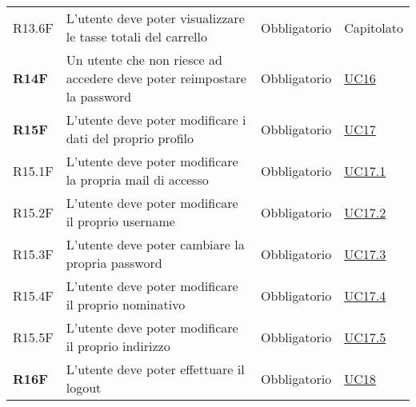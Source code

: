 \begin{center}
\begin{longtable}[!h]{p{50px} p{245px} p{75px} p{50px}}
        R13.6F                                & L'utente deve poter visualizzare le tasse totali del carrello                                                                                          & Obbligatorio             & Capitolato                                     \\
        \textbf{R14F}                         & Un utente che non riesce ad accedere deve poter reimpostare la password                                                                                & Obbligatorio             & \hyperref[sec:UC16]{UC16}                      \\
        \textbf{R15F}                         & L'utente deve poter modificare i dati del proprio profilo                                                                                              & Obbligatorio             & \hyperref[sec:UC17]{UC17}                      \\
        R15.1F                                & L'utente deve poter modificare la propria mail di accesso                                                                                              & Obbligatorio             & \hyperref[sec:UC17.1]{UC17.1}                  \\
        R15.2F                                & L'utente deve poter modificare il proprio username                                                                                                     & Obbligatorio             & \hyperref[sec:UC17.2]{UC17.2}                  \\
        R15.3F                                & L'utente deve poter cambiare la propria password                                                                                                       & Obbligatorio             & \hyperref[sec:UC17.3]{UC17.3}                  \\
        R15.4F                                & L'utente deve poter modificare il proprio nominativo                                                                                                   & Obbligatorio             & \hyperref[sec:UC17.4]{UC17.4}                  \\
        R15.5F                                & L'utente deve poter modificare il proprio indirizzo                                                                                                    & Obbligatorio             & \hyperref[sec:UC17.5]{UC17.5}                  \\
        \textbf{R16F}                         & L'utente deve poter effettuare il logout                                                                                                               & Obbligatorio             & \hyperref[sec:UC18]{UC18}                      \\

\end{longtable}
\end{center}
